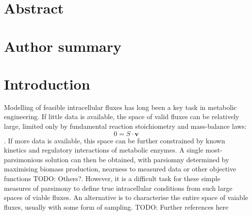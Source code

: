 \documentclass[10pt,letterpaper]{article}
\begin{document}
\section*{Abstract}


\section*{Author summary}


\linenumbers

\section*{Introduction}

Modelling of feasible intracellular fluxes has long been a key task in metabolic engineering.
If little data is available, the space of valid fluxes can be relatively large, limited only by fundamental reaction stoichiometry and mass-balance laws:
\[
    0 = S\cdot \mathbf{v} \label{eq:steady_state}
\].
If more data is available, this space can be further constrained by known kinetics and regulatory interactions of metabolic enzymes.
A single most-parsimonious solution can then be obtained, with parsiomny determined by maximising biomass production, nearness to measured data or other objective functions {TODO: Others?}.
However, it is a difficult task for these simple measures of parsimony to define true intracellular conditions from such large spaces of viable fluxes.
An alternative is to characterise the entire space of vaiable fluxes, usually with some form of sampling. {TODO: Further references here}
\end{document}
